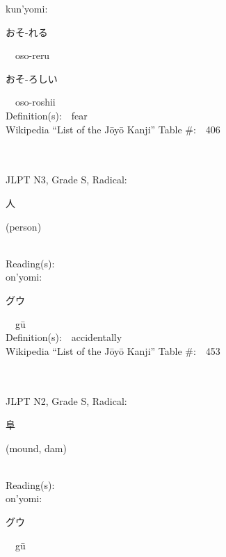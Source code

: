 \begin{multicols}{2}
{\hspace*{1em}}kun'yomi:\ \ \\
{\hspace*{2em}}{\begin{CJK}{UTF8}{min} おそ-れる \end{CJK}}\ \ oso-reru\ \ \\
{\hspace*{2em}}{\begin{CJK}{UTF8}{min} おそ-ろしい \end{CJK}}\ \ oso-roshii\ \ \\
Definition(s):\ \ fear \\
Wikipedia ``List of the J\=oy\=o Kanji'' Table \#:\ \ 406 \\
\ \ \\
{\fontsize{34pt}{40pt}  }\ \ \\  %
{JLPT N3, Grade S, Radical:\ \ {\begin{CJK}{UTF8}{min} 人 \end{CJK}} (person) } \\
Reading(s):\ \ \\
{\hspace*{1em}}on'yomi:\ \ \\
{\hspace*{2em}}{\begin{CJK}{UTF8}{min} グウ \end{CJK}}\ \ g\=u\ \ \\
Definition(s):\ \ accidentally \\
Wikipedia ``List of the J\=oy\=o Kanji'' Table \#:\ \ 453 \\
\ \ \\
{\fontsize{34pt}{40pt}  }\ \ \\  %
{JLPT N2, Grade S, Radical:\ \ {\begin{CJK}{UTF8}{min} 阜 \end{CJK}} (mound, dam) } \\
Reading(s):\ \ \\
{\hspace*{1em}}on'yomi:\ \ \\
{\hspace*{2em}}{\begin{CJK}{UTF8}{min} グウ \end{CJK}}\ \ g\=u\ \ \\

\end{multicols}
